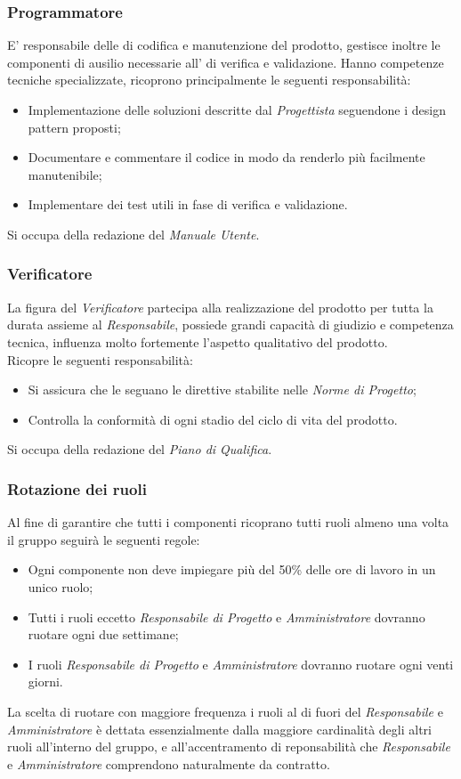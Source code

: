 \documentclass{scalatekids-article}
\begin{document}
\subsubsection{Programmatore}
E' responsabile delle  di codifica e manutenzione del prodotto, gestisce
inoltre le componenti di ausilio necessarie all' di verifica e
validazione. Hanno competenze tecniche specializzate, ricoprono principalmente
le seguenti responsabilità:
\begin{itemize}
\item Implementazione delle soluzioni descritte dal \textit{Progettista}
  seguendone i design pattern proposti;
\item Documentare e commentare il codice in modo da renderlo più facilmente
  manutenibile;
\item Implementare dei test utili in fase di verifica e validazione.
\end{itemize}
Si occupa della redazione del \textit{Manuale Utente}.
\subsubsection{Verificatore}
La figura del \textit{Verificatore} partecipa alla realizzazione del prodotto per
tutta la durata assieme al \textit{Responsabile}, possiede grandi capacità di
giudizio e competenza tecnica, influenza molto fortemente l'aspetto qualitativo
del prodotto.\\ Ricopre le seguenti responsabilità:
\begin{itemize}
\item Si assicura che le  seguano le direttive stabilite nelle \textit{Norme di Progetto};
\item Controlla la conformità di ogni stadio del ciclo di vita del prodotto.
\end{itemize}
Si occupa della redazione del \textit{Piano di Qualifica}.
\subsubsection{Rotazione dei ruoli}
Al fine di garantire che tutti i componenti ricoprano tutti ruoli almeno una volta il gruppo seguirà le seguenti regole:
\begin{itemize}
\item Ogni componente non deve impiegare più del 50\% delle ore di lavoro in un unico ruolo;
\item Tutti i ruoli eccetto \textit{Responsabile di Progetto} e \textit{Amministratore} dovranno ruotare ogni due settimane;
\item I ruoli \textit{Responsabile di Progetto} e \textit{Amministratore} dovranno ruotare ogni venti giorni.
\end{itemize}
La scelta di ruotare con maggiore frequenza i ruoli al di fuori del
\textit{Responsabile} e \textit{Amministratore} è dettata essenzialmente dalla
maggiore cardinalità degli altri ruoli all'interno del gruppo, e
all'accentramento di reponsabilità che \textit{Responsabile} e
\textit{Amministratore} comprendono naturalmente da contratto.
\end{document}
